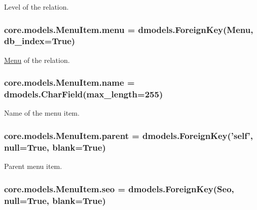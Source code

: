 Level of the relation. 

\hypertarget{classcore_1_1models_1_1MenuItem_afebbc45130eae0cea9c5095ef6cd98b1}{
\subsubsection[{menu}]{\setlength{\rightskip}{0pt plus 5cm}core.\-models.\-Menu\-Item.\-menu = dmodels.\-Foreign\-Key({\bf Menu}, db\-\_\-index=True)\hspace{0.3cm}{\ttfamily [static]}}}\label{classcore_1_1models_1_1MenuItem_afebbc45130eae0cea9c5095ef6cd98b1}


\hyperlink{classcore_1_1models_1_1Menu}{Menu} of the relation. 

\hypertarget{classcore_1_1models_1_1MenuItem_ab3946f967b3a1fce02d39c5ecb2185f5}{
\subsubsection[{name}]{\setlength{\rightskip}{0pt plus 5cm}core.\-models.\-Menu\-Item.\-name = dmodels.\-Char\-Field(max\-\_\-length=255)\hspace{0.3cm}{\ttfamily [static]}}}\label{classcore_1_1models_1_1MenuItem_ab3946f967b3a1fce02d39c5ecb2185f5}


Name of the menu item. 

\hypertarget{classcore_1_1models_1_1MenuItem_ac284a37490aad36640bd848f29466232}{
\subsubsection[{parent}]{\setlength{\rightskip}{0pt plus 5cm}core.\-models.\-Menu\-Item.\-parent = dmodels.\-Foreign\-Key('self', null=True, blank=True)\hspace{0.3cm}{\ttfamily [static]}}}\label{classcore_1_1models_1_1MenuItem_ac284a37490aad36640bd848f29466232}


Parent menu item. 

\hypertarget{classcore_1_1models_1_1MenuItem_a0ed621cf4f336eee94ee6af73f138add}{
\subsubsection[{seo}]{\setlength{\rightskip}{0pt plus 5cm}core.\-models.\-Menu\-Item.\-seo = dmodels.\-Foreign\-Key({\bf Seo}, null=True, blank=True)\hspace{0.3cm}{\ttfamily [static]}}}\label{classcore_1_1models_1_1MenuItem_a0ed621cf4f336eee94ee6af73f138add}



